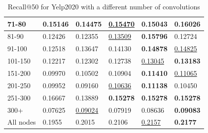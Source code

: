 \begin{table}[]
\begin{tabular}{|l|l|l|l|l|l|}
        71-80     & 0.15146                    & 0.14475                    & \underline{0.15470}        & 0.15043                    & \textbf{0.16026}           \\ \hline
        81-90     & 0.12426                    & 0.12355                    & \underline{0.13509}        & \textbf{0.15796}           & 0.12724                    \\ \hline
        91-100    & 0.12518                    & 0.13647                    & 0.14130                    & \textbf{0.14878}           & \underline{0.14825}        \\ \hline
        101-150   & 0.12217                    & 0.12302                    & 0.12738                    & \underline{0.13045}        & \textbf{0.13183}           \\ \hline
        151-200   & 0.09970                     & 0.10502                    & 0.10904                    & \textbf{0.11410}           & \underline{0.11065}        \\ \hline
        201-250   & 0.09952                    & 0.09160                    & \underline{0.10636}        & \textbf{0.11138}           & 0.10450                    \\ \hline
        251-300   & 0.16667                    & 0.13889                    & \textbf{0.15278}           & \textbf{0.15278}           & \textbf{0.15278}           \\ \hline
        300+      & 0.07625                    & \underline{0.09024}        & 0.07919                    & 0.08636                    & \textbf{0.09083}           \\ \hline
        All nodes & 0.1955                     & 0.2015                     & 0.2106                     & \underline{0.2157}         & \textbf{0.2177}            \\ \hline
    \end{tabular}
    \caption{Recall@50 for Yelp2020 with a different number of convolutions}
    \label{tab:Yelp2020-recall-evaluation-mean}
\end{table}

